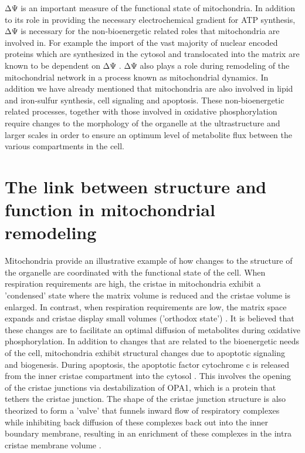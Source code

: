  ΔΨ is an important measure of the functional state of mitochondria. In addition to its role in providing the necessary electrochemical gradient for ATP synthesis, ΔΨ is necessary for the non-bioenergetic related roles that mitochondria are involved in. For example the import of the vast majority of nuclear encoded proteins which are synthesized in the cytosol and translocated into the matrix are known to be dependent on ΔΨ \cite{schmidt_mitochondrial_2010, wiedemann_protein_2004}. ΔΨ also plays a role during remodeling of the mitochondrial network in a process known as mitochondrial dynamics. In addition we have already mentioned that mitochondria are also involved in lipid and iron-sulfur synthesis, cell signaling and apoptosis. These non-bioenergetic related processes, together with those involved in oxidative phosphorylation require changes to the morphology of the organelle at the ultrastructure and larger scales in order to ensure an optimum level of metabolite flux between the various compartments in the cell.
\section{The link between structure and function in mitochondrial remodeling}
Mitochondria provide an illustrative example of how changes to the structure of the organelle are coordinated with the functional state of the cell. When respiration requirements are high, the cristae in mitochondria exhibit a 'condensed' state where the matrix volume is reduced and the cristae volume is enlarged. In contrast, when respiration requirements are low, the matrix space expands and cristae display small volumes ('orthodox state') \cite{hackenbrock_ultrastructural_1968}. It is believed that these changes are to facilitate an optimal diffusion of metabolites during oxidative phosphorylation. In addition to changes that are related to the bioenergetic needs of the cell, mitochondria exhibit structural changes due to apoptotic signaling and biogenesis. During apoptosis, the apoptotic factor cytochrome c is released from the inner cristae compartment into the cytosol \cite{bernardi_cytochrome_1981}. This involves the opening of the cristae junctions via destabilization of OPA1, which is a protein that tethers the cristae junction. The shape of the cristae junction structure is also theorized to form a 'valve' that funnels inward flow of respiratory complexes while inhibiting back diffusion of these complexes back out into the inner boundary membrane, resulting in an enrichment of these complexes in the intra cristae membrane volume \cite{frey_insight_2002}.

